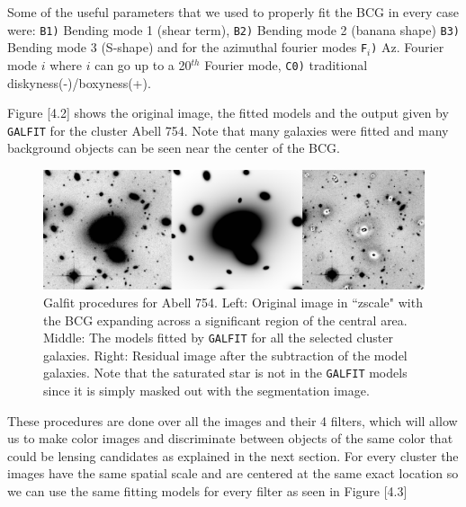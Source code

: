 Some of the useful parameters that we used to properly fit the BCG in every case were: \texttt{B1)} Bending mode 1 (shear term), \texttt{B2)} Bending mode 2 (banana shape)
\texttt{B3)} Bending mode 3 (S-shape) and for the azimuthal fourier modes
\texttt{F$_i$)} Az. Fourier mode $i$ where $i$ can go up to a 20$^{th}$ Fourier mode, \texttt{C0)}   traditional diskyness(-)/boxyness(+).

Figure [4.2] shows the original image, the fitted models and the output given by \texttt{GALFIT} for the cluster Abell 754. Note that many galaxies were fitted and many background objects can be seen near the center of the BCG. 

\begin{figure}[H]
\centering
\includegraphics[width=15cm]{images/galfit.png}
\caption[Galfit results for Abell 754]{Galfit procedures for Abell 754. Left: Original image in ``zscale" with the BCG expanding across a significant region of the central area. Middle: The models fitted by \texttt{GALFIT} for all the selected cluster galaxies. Right: Residual image after the subtraction of the model galaxies. Note that the saturated star is not in the \texttt{GALFIT} models since it is simply masked out with the segmentation image.}
\end{figure}

These procedures are done over all the images and their 4 filters, which will allow us to make color images and discriminate between objects of the same color that could be lensing candidates as explained in the next section. For every cluster the images have the same spatial scale and are centered at the same exact location so we can use the same fitting models for every filter as seen in Figure [4.3]

